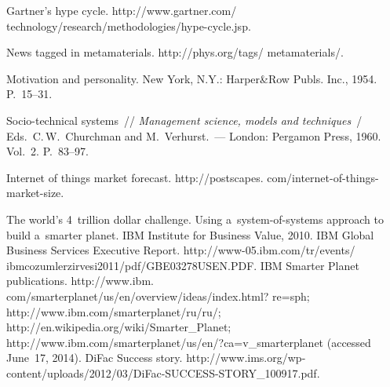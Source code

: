 



 \begin{multicols}{2}

\renewcommand{\bibname}{\protect\rmfamily Литература}

{\small\frenchspacing
{%
\begin{thebibliography}{99}


Gartner's hype cycle. {\sf http://www.gartner.com/ technology/research/methodologies/hype-cycle.jsp}.

News tagged in metamaterials.
 {\sf http://phys.org/tags/ metamaterials/}.

{Motivation and personality}. New York, N.Y.: Harper\&Row Publs.
Inc., 1954. P.~15--31.

 Socio-technical systems~// \textit{Management science, models
and techniques}~/ Eds.\  C.\,W.~Churchman and  M.~Verhurst.~---  London: Pergamon Press,
 1960. Vol.~2. P.~83--97.

Internet of things market forecast.
{\sf http://postscapes. com/internet-of-things-market-size}.

 The world's 4~trillion dollar challenge. Using a~system-of-systems approach to build a~smarter
planet.
 IBM Institute for Business Value, 2010.
 IBM Global Business Services Executive Report. {\sf
http://www-05.ibm.com/tr/events/ ibmcozumlerzirvesi2011/pdf/GBE03278USEN.PDF}.
IBM Smarter Planet publications. {\sf
http://www.ibm. com/smarterplanet/us/en/overview/ideas/index.html? re=sph};
{\sf http://www.ibm.com/smarterplanet/ru/ru/};
{\sf http://en.wikipedia.org/wiki/Smarter\_Planet};
{\sf http://www.ibm.com/smarterplanet/us/en/?ca=v\_\linebreak smarterplanet} (accessed June~17, 2014).
DiFac Success story. {\sf
http://www.ims.org/wp-content/uploads/2012/03/DiFac-SUCCESS-STORY\_\linebreak 100917.pdf}.


\end{thebibliography}}}
\end{multicols}
